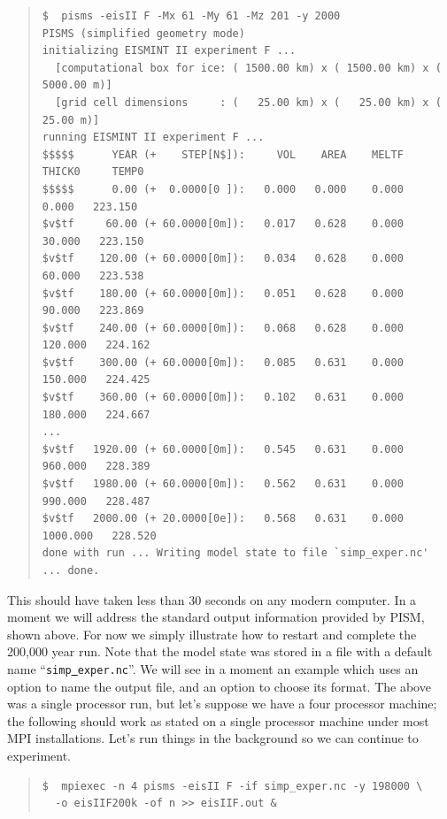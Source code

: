 \documentclass[11pt,final]{amsart}
\begin{document}
\small\begin{quote}\begin{verbatim}
$  pisms -eisII F -Mx 61 -My 61 -Mz 201 -y 2000
PISMS (simplified geometry mode)
initializing EISMINT II experiment F ...
  [computational box for ice: ( 1500.00 km) x ( 1500.00 km) x ( 5000.00 m)]
  [grid cell dimensions     : (   25.00 km) x (   25.00 km) x (   25.00 m)]
running EISMINT II experiment F ...
$$$$$      YEAR (+    STEP[N$]):     VOL    AREA    MELTF     THICK0     TEMP0
$$$$$      0.00 (+  0.0000[0 ]):   0.000   0.000    0.000      0.000   223.150
$v$tf     60.00 (+ 60.0000[0m]):   0.017   0.628    0.000     30.000   223.150
$v$tf    120.00 (+ 60.0000[0m]):   0.034   0.628    0.000     60.000   223.538
$v$tf    180.00 (+ 60.0000[0m]):   0.051   0.628    0.000     90.000   223.869
$v$tf    240.00 (+ 60.0000[0m]):   0.068   0.628    0.000    120.000   224.162
$v$tf    300.00 (+ 60.0000[0m]):   0.085   0.631    0.000    150.000   224.425
$v$tf    360.00 (+ 60.0000[0m]):   0.102   0.631    0.000    180.000   224.667
...
$v$tf   1920.00 (+ 60.0000[0m]):   0.545   0.631    0.000    960.000   228.389
$v$tf   1980.00 (+ 60.0000[0m]):   0.562   0.631    0.000    990.000   228.487
$v$tf   2000.00 (+ 20.0000[0e]):   0.568   0.631    0.000   1000.000   228.520
done with run ... Writing model state to file `simp_exper.nc' ... done.
\end{verbatim}
\end{quote}\normalsize

This should have taken less than 30 seconds on any modern computer.  In a moment we will address the standard output information provided by PISM, shown above.  For now we simply illustrate how to restart and complete the 200,000 year run.  Note that the model state was stored in a file with a default name ``\texttt{simp\underline{ }exper.nc}''.  We will see in a moment an example which uses an option to name the output file, and an option to choose its format.  The above was a single processor run, but let's suppose we have a four processor machine; the following should work as stated on a single processor machine under most MPI installations.  Let's run things in the background so we can continue to experiment.

\small\begin{quote}\begin{verbatim}
$  mpiexec -n 4 pisms -eisII F -if simp_exper.nc -y 198000 \
  -o eisIIF200k -of n >> eisIIF.out &
\end{verbatim}
\end{quote}\normalsize
\end{document}
